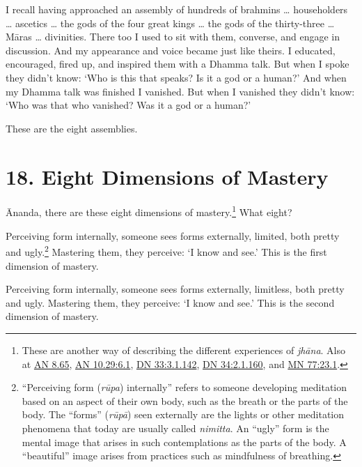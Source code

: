 \documentclass[12pt,openany]{book}%
\begin{document}
I recall having approached an assembly of hundreds of brahmins … householders … ascetics … the gods of the four great kings … the gods of the thirty-three … \textsanskrit{Māras} … divinities. There too I used to sit with them, converse, and engage in discussion. And my appearance and voice became just like theirs. I educated, encouraged, fired up, and inspired them with a Dhamma talk. But when I spoke they didn’t know: ‘Who is this that speaks? Is it a god or a human?’ And when my Dhamma talk was finished I vanished. But when I vanished they didn’t know: ‘Who was that who vanished? Was it a god or a human?’ 

These are the eight assemblies. 

\section*{18. Eight Dimensions of Mastery }

Ānanda, there are these eight dimensions of mastery.\footnote{These are another way of describing the different experiences of \textit{\textsanskrit{jhāna}}. Also at \href{https://suttacentral.net/an8.65/en/sujato}{AN 8.65}, \href{https://suttacentral.net/an10.29/en/sujato\#6.1}{AN 10.29:6.1}, \href{https://suttacentral.net/dn33/en/sujato\#3.1.142}{DN 33:3.1.142}, \href{https://suttacentral.net/dn34/en/sujato\#2.1.160}{DN 34:2.1.160}, and \href{https://suttacentral.net/mn77/en/sujato\#23.1}{MN 77:23.1}. } What eight? 

Perceiving form internally, someone sees forms externally, limited, both pretty and ugly.\footnote{“Perceiving form (\textit{\textsanskrit{rūpa}}) internally” refers to someone developing meditation based on an aspect of their own body, such as the breath or the parts of the body. The “forms” (\textit{\textsanskrit{rūpā}}) seen externally are the lights or other meditation phenomena that today are usually called \textit{nimitta}. An “ugly” form is the mental image that arises in such contemplations as the parts of the body. A “beautiful” image arises from practices such as mindfulness of breathing. } Mastering them, they perceive: ‘I know and see.’ This is the first dimension of mastery. 

Perceiving form internally, someone sees forms externally, limitless, both pretty and ugly. Mastering them, they perceive: ‘I know and see.’ This is the second dimension of mastery. 
\end{document}
